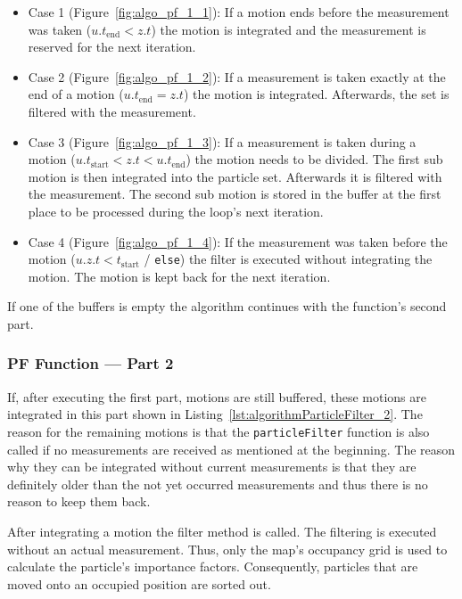 \begin{itemize}
\item{Case 1} (Figure~\ref{fig:algo_pf_1_1}): If a motion ends before the measurement was taken ($u.{t_\text{end}} < z.t$) the motion is integrated and the measurement is reserved for the next iteration.

\item{Case 2} (Figure~\ref{fig:algo_pf_1_2}): If a measurement is taken exactly at the end of a motion ($u.{t_\text{end}} = z.t$) the motion is integrated. Afterwards, the set is filtered with the measurement.

\item{Case 3} (Figure~\ref{fig:algo_pf_1_3}): If a measurement is taken during a motion ($u.{t_\text{start}} < z.t < u.{t_\text{end}}$) the motion needs to be divided. The first sub motion is then integrated into the particle set. Afterwards it is filtered with the measurement. The second sub motion is stored in the buffer at the first place to be processed during the loop's next iteration.

\item{Case 4} (Figure~\ref{fig:algo_pf_1_4}): If the measurement was taken before the motion ($u.{z.t < t_\text{start}}$ / \texttt{else}) the filter is executed without integrating the motion. The motion is kept back for the next iteration.
\end{itemize}

\noindent If one of the buffers is empty the algorithm continues with the function's second part.


\subsubsection*{\acl{PF} Function --- Part 2}
If, after executing the first part, motions are still buffered, these motions are integrated in this part shown in Listing~\ref{lst:algorithmParticleFilter_2}. The reason for the remaining motions is that the \texttt{particleFilter} function is also called if no measurements are received as mentioned at the beginning. The reason why they can be integrated without current measurements is that they are definitely older than the not yet occurred measurements and thus there is no reason to keep them back.

After integrating a motion the filter method is called. The filtering is executed without an actual measurement. Thus, only the map's occupancy grid is used to calculate the particle's importance factors. Consequently, particles that are moved onto an occupied position are sorted out.


